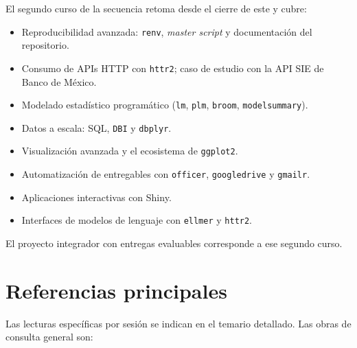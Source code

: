 \documentclass[11pt,letterpaper]{article}
\begin{document}
El segundo curso de la secuencia retoma desde el cierre de este y cubre:

\begin{itemize}[leftmargin=*, itemsep=1pt]
    \item Reproducibilidad avanzada: \texttt{renv}, \textit{master script} y documentación del repositorio.
    \item Consumo de APIs HTTP con \texttt{httr2}; caso de estudio con la API SIE de Banco de México.
    \item Modelado estadístico programático (\texttt{lm}, \texttt{plm}, \texttt{broom}, \texttt{modelsummary}).
    \item Datos a escala: SQL, \texttt{DBI} y \texttt{dbplyr}.
    \item Visualización avanzada y el ecosistema de \texttt{ggplot2}.
    \item Automatización de entregables con \texttt{officer}, \texttt{googledrive} y \texttt{gmailr}.
    \item Aplicaciones interactivas con Shiny.
    \item Interfaces de modelos de lenguaje con \texttt{ellmer} y \texttt{httr2}.
\end{itemize}

El proyecto integrador con entregas evaluables corresponde a ese segundo curso.

\section{Referencias principales}

Las lecturas específicas por sesión se indican en el temario detallado. Las obras de consulta general son:

\nocite{wickham2023r4ds, wickham2019advr, wickham2016ggplot2, rcoreteam-intro, bryan-happygit}

\printbibliography[heading=none]
\end{document}
